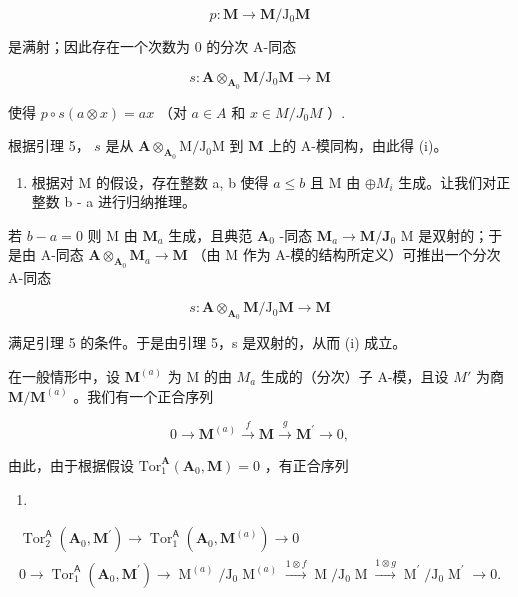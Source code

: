 \[
p: \mathbf {M} \rightarrow \mathbf {M} / \mathrm{J} _ {0} \mathbf {M}
\]

是满射；因此存在一个次数为 0 的分次 A-同态

\[
s: \mathbf {A} \otimes_ {\mathbf {A} _ {0}} \mathbf {M} / \mathrm{J} _ {0} \mathbf {M} \rightarrow \mathbf {M}
\]

使得 \(p \circ s(a \otimes x) = ax\) （对 \(a \in A\) 和 \(x \in M / J_0 M\) ）.

根据引理 5， \(s\) 是从 \(\mathbf{A} \otimes_{\mathbf{A}_0} \mathrm{M} / \mathrm{J}_0 \mathrm{M}\) 到 \(\mathbf{M}\) 上的 A-模同构，由此得 (i)。

\begin{enumerate}
\def\labelenumi{\alph{enumi})}
\setcounter{enumi}{1}
\tightlist
\item
  根据对 M 的假设，存在整数 a, b 使得 \(a \leqslant b\) 且 M 由 \(\oplus M_{i}\) 生成。让我们对正整数 b - a 进行归纳推理。
\end{enumerate}

若 \(b - a = 0\) 则 M 由 \(\mathbf{M}_a\) 生成，且典范 \(\mathbf{A}_0\) -同态 \(\mathbf{M}_a \to \mathbf{M} / \mathbf{J}_0\) M 是双射的；于是由 A-同态 \(\mathbf{A} \otimes_{\mathbf{A}_0} \mathbf{M}_a \to \mathbf{M}\) （由 M 作为 A-模的结构所定义）可推出一个分次 A-同态

\[
s: \mathbf {A} \otimes_ {\mathbf {A} _ {0}} \mathbf {M} / \mathrm{J} _ {0} \mathbf {M} \rightarrow \mathbf {M}
\]

满足引理 5 的条件。于是由引理 5，s 是双射的，从而 (i) 成立。

在一般情形中，设 \(\mathbf{M}^{(a)}\) 为 M 的由 \(M_{a}\) 生成的（分次）子 A-模，且设 \(M'\) 为商 \(\mathbf{M}/\mathbf{M}^{(a)}\) 。我们有一个正合序列

\[
0 \to \mathbf {M} ^ {(a)} \xrightarrow {f} \mathbf {M} \xrightarrow {g} \mathbf {M} ^ {\prime} \to 0,
\]

由此，由于根据假设 \(\mathrm{Tor}_{1}^{\mathbf{A}}(\mathbf{A}_{0},\mathbf{M}) = 0\) ，有正合序列

\begin{enumerate}
\def\labelenumi{(\arabic{enumi})}
\setcounter{enumi}{5}
\tightlist
\item
\end{enumerate}

\[
\begin{array}{c} \operatorname{Tor} _ {2} ^ {\mathsf {A}} (\mathbf {A} _ {0}, \mathbf {M} ^ {\prime}) \to \operatorname{Tor} _ {1} ^ {\mathsf {A}} (\mathbf {A} _ {0}, \mathbf {M} ^ {(a)}) \to 0 \\ 0 \to \operatorname{Tor} _ {1} ^ {\mathsf {A}} (\mathbf {A} _ {0}, \mathbf {M} ^ {\prime}) \to \operatorname{M} ^ {(a)} / \mathrm{J} _ {0} \operatorname{M} ^ {(a)} \xrightarrow {1 \otimes f} \operatorname{M} / \mathrm{J} _ {0} \operatorname{M} \xrightarrow {1 \otimes g} \operatorname{M} ^ {\prime} / \mathrm{J} _ {0} \operatorname{M} ^ {\prime} \to 0. \end{array}\tag{7}
\]

